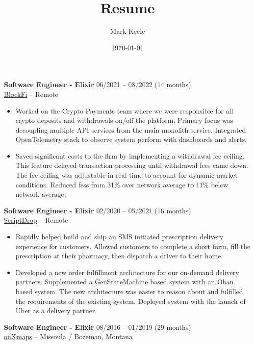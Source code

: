 \documentclass[12pt,letterpaper]{article}
\author{Mark Keele}
\title{Resume}
\date{\today}
\begin{document}
\noindent\textbf{Software Engineer - Elixir}
\hfill{06/2021 -- 08/2022 (14 months)} \\
\href{https://blockfi.com/}{BlockFi} -- Remote

\begin{itemize}

  \item Worked on the Crypto Payments team where we were responsible for all crypto deposits and withdrawals on/off the platform. Primary focus was decoupling multiple API services from the main monolith service. Integrated OpenTelemetry stack to observe system perform with dashboards and alerts.

  \item Saved significant costs to the firm by implementing a withdrawal fee ceiling. This feature delayed transaction processing until withdrawal fees came down. The fee ceiling was adjustable in real-time to account for dynamic market conditions. Reduced fess from 31\% over network average to 11\% below network average.

\end{itemize}

\noindent\textbf{Software Engineer - Elixir}
\hfill{02/2020 -- 05/2021 (16 months)} \\
\href{https://scriptdrop.co/}{ScriptDrop} -- Remote

\begin{itemize}

  \item Rapidly helped build and ship an SMS initiated prescription delivery experience for customers. Allowed customers to complete a short form, fill the prescription at their pharmacy, then dispatch a driver to their home.

  \item Developed a new order fulfillment architecture for our on-demand delivery partners. Supplemented a GenStateMachine based system with an Oban based system. The new architecture was easier to reason about and fulfilled the requirements of the existing system. Deployed system with the launch of Uber as a delivery partner.

\end{itemize}

\noindent\textbf{Software Engineer - Elixir}
\hfill{08/2016 -- 01/2019 (29 months)} \\
\href{https://www.onxmaps.com/}{onXmaps} -- Missoula / Bozeman, Montana
\end{document}
